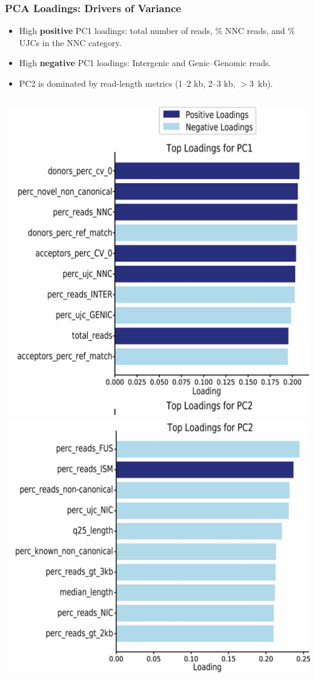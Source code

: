 \documentclass[aspectratio=169]{beamer}
\begin{document}
\begin{frame}
  \frametitle{PCA Loadings: Drivers of Variance}
  \begin{itemize}
    \item High \textbf{positive} PC1 loadings: total number of reads, \% NNC reads, and \% UJCs in the NNC category.
    \item High \textbf{negative} PC1 loadings: Intergenic and Genic–Genomic reads.
    \item PC2 is dominated by read-length metrics (1–2 kb, 2–3 kb, $>3$~kb).
  \end{itemize}
  \vspace{0.3cm}
  \centering
  \begin{columns}[c]
      \includegraphics[width=\linewidth]{Genome Res_figure2_b1.jpg}
      \includegraphics[width=\linewidth]{Genome Res_figure2_b2.jpg}

\end{columns}
\end{frame}
\end{document}
